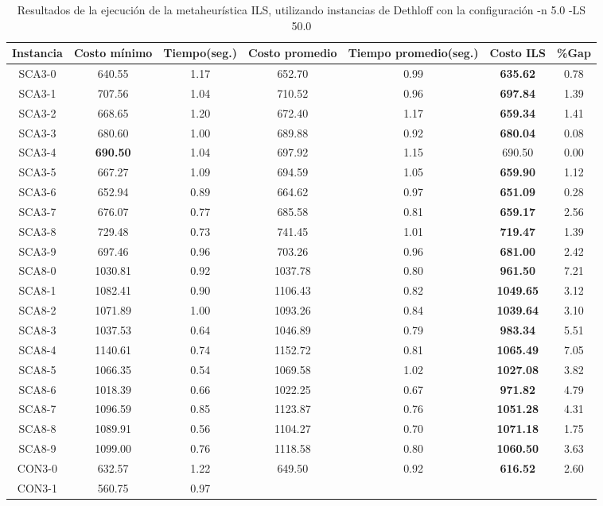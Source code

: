 \begin{table}[ht]
\caption{Resultados de la ejecución de la metaheurística ILS, utilizando instancias de Dethloff con la configuración -n 5.0 -LS 50.0}
\centering
\small
\begin{tabular}{c c c c c c c}
\hline\hline
Instancia & Costo mínimo & Tiempo(seg.) & Costo promedio & Tiempo promedio(seg.) & Costo ILS & \%Gap \\ [0.5ex]
\hline
SCA3-0 & 640.55 & 1.17 & 
652.70 & 0.99 & \bf{635.62} & 
0.78\\SCA3-1 & 707.56 & 1.04 & 
710.52 & 0.96 & \bf{697.84} & 
1.39\\SCA3-2 & 668.65 & 1.20 & 
672.40 & 1.17 & \bf{659.34} & 
1.41\\SCA3-3 & 680.60 & 1.00 & 
689.88 & 0.92 & \bf{680.04} & 
0.08\\SCA3-4 & \bf{690.50} & 1.04 & 
697.92 & 1.15 & 690.50 & 0.00\\
SCA3-5 & 667.27 & 1.09 & 
694.59 & 1.05 & \bf{659.90} & 
1.12\\SCA3-6 & 652.94 & 0.89 & 
664.62 & 0.97 & \bf{651.09} & 
0.28\\SCA3-7 & 676.07 & 0.77 & 
685.58 & 0.81 & \bf{659.17} & 
2.56\\SCA3-8 & 729.48 & 0.73 & 
741.45 & 1.01 & \bf{719.47} & 
1.39\\SCA3-9 & 697.46 & 0.96 & 
703.26 & 0.96 & \bf{681.00} & 
2.42\\SCA8-0 & 1030.81 & 0.92 & 
1037.78 & 0.80 & \bf{961.50} & 
7.21\\SCA8-1 & 1082.41 & 0.90 & 
1106.43 & 0.82 & \bf{1049.65} & 
3.12\\SCA8-2 & 1071.89 & 1.00 & 
1093.26 & 0.84 & \bf{1039.64} & 
3.10\\SCA8-3 & 1037.53 & 0.64 & 
1046.89 & 0.79 & \bf{983.34} & 
5.51\\SCA8-4 & 1140.61 & 0.74 & 
1152.72 & 0.81 & \bf{1065.49} & 
7.05\\SCA8-5 & 1066.35 & 0.54 & 
1069.58 & 1.02 & \bf{1027.08} & 
3.82\\SCA8-6 & 1018.39 & 0.66 & 
1022.25 & 0.67 & \bf{971.82} & 
4.79\\SCA8-7 & 1096.59 & 0.85 & 
1123.87 & 0.76 & \bf{1051.28} & 
4.31\\SCA8-8 & 1089.91 & 0.56 & 
1104.27 & 0.70 & \bf{1071.18} & 
1.75\\SCA8-9 & 1099.00 & 0.76 & 
1118.58 & 0.80 & \bf{1060.50} & 
3.63\\CON3-0 & 632.57 & 1.22 & 
649.50 & 0.92 & \bf{616.52} & 
2.60\\CON3-1 & 560.75 & 0.97 & 

\end{tabular}
\end{table}
